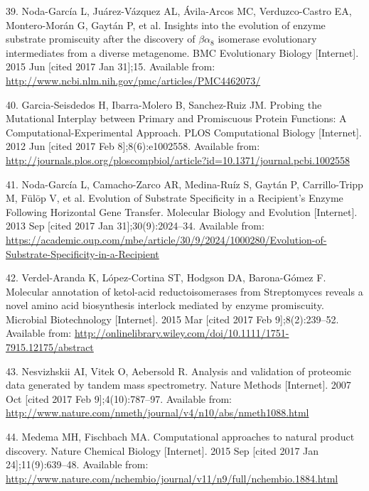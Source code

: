 \documentclass[12pt,twoside]{reedthesis}
\begin{document}
  \hypertarget{ref-noda-garcia_insights_2015}{}
  39. Noda-García L, Juárez-Vázquez AL, Ávila-Arcos MC, Verduzco-Castro
  EA, Montero-Morán G, Gaytán P, et al. Insights into the evolution of
  enzyme substrate promiscuity after the discovery of \(\beta\alpha_8\)
  isomerase evolutionary intermediates from a diverse metagenome. BMC
  Evolutionary Biology {[}Internet{]}. 2015 Jun {[}cited 2017 Jan
  31{]};15. Available from:
  \url{http://www.ncbi.nlm.nih.gov/pmc/articles/PMC4462073/}
  
  \hypertarget{ref-garcia-seisdedos_probing_2012}{}
  40. Garcia-Seisdedos H, Ibarra-Molero B, Sanchez-Ruiz JM. Probing the
  Mutational Interplay between Primary and Promiscuous Protein Functions:
  A Computational-Experimental Approach. PLOS Computational Biology
  {[}Internet{]}. 2012 Jun {[}cited 2017 Feb 8{]};8(6):e1002558. Available
  from:
  \url{http://journals.plos.org/ploscompbiol/article?id=10.1371/journal.pcbi.1002558}
  
  \hypertarget{ref-noda-garcia_evolution_2013}{}
  41. Noda-García L, Camacho-Zarco AR, Medina-Ruíz S, Gaytán P,
  Carrillo-Tripp M, Fülöp V, et al. Evolution of Substrate Specificity in
  a Recipient's Enzyme Following Horizontal Gene Transfer. Molecular
  Biology and Evolution {[}Internet{]}. 2013 Sep {[}cited 2017 Jan
  31{]};30(9):2024--34. Available from:
  \url{https://academic.oup.com/mbe/article/30/9/2024/1000280/Evolution-of-Substrate-Specificity-in-a-Recipient}
  
  \hypertarget{ref-verdel-aranda_molecular_2015}{}
  42. Verdel-Aranda K, López-Cortina ST, Hodgson DA, Barona-Gómez F.
  Molecular annotation of ketol-acid reductoisomerases from Streptomyces
  reveals a novel amino acid biosynthesis interlock mediated by enzyme
  promiscuity. Microbial Biotechnology {[}Internet{]}. 2015 Mar {[}cited
  2017 Feb 9{]};8(2):239--52. Available from:
  \url{http://onlinelibrary.wiley.com/doi/10.1111/1751-7915.12175/abstract}
  
  \hypertarget{ref-nesvizhskii_analysis_2007}{}
  43. Nesvizhskii AI, Vitek O, Aebersold R. Analysis and validation of
  proteomic data generated by tandem mass spectrometry. Nature Methods
  {[}Internet{]}. 2007 Oct {[}cited 2017 Feb 9{]};4(10):787--97. Available
  from:
  \url{http://www.nature.com/nmeth/journal/v4/n10/abs/nmeth1088.html}
  
  \hypertarget{ref-medema_computational_2015}{}
  44. Medema MH, Fischbach MA. Computational approaches to natural product
  discovery. Nature Chemical Biology {[}Internet{]}. 2015 Sep {[}cited
  2017 Jan 24{]};11(9):639--48. Available from:
  \url{http://www.nature.com/nchembio/journal/v11/n9/full/nchembio.1884.html}
  
\end{document}
